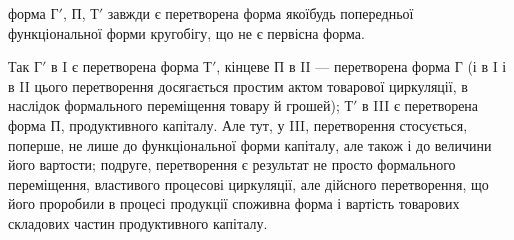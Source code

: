 \parcont{}  %
форма $Г'$, $П$, $Т'$ завжди є перетворена форма якоїбудь попередньої функціональної форми кругобігу, що
не є первісна форма.

Так $Г'$ в I є перетворена форма $Т'$, кінцеве $П$ в II — перетворена форма $Г$ (і в I і в II цього
перетворення досягається простим актом товарової циркуляції, в наслідок формального переміщення
товару й грошей); $Т'$ в III є перетворена форма $П$, продуктивного капіталу. Але тут, у III,
перетворення стосується, поперше, не лише до функціональної форми капіталу, але також і до величини
його вартости; подруге, перетворення є результат не просто формального переміщення, властивого
процесові циркуляції, але дійсного перетворення, що його проробили в процесі продукції споживна
форма і вартість товарових складових частин продуктивного капіталу.

